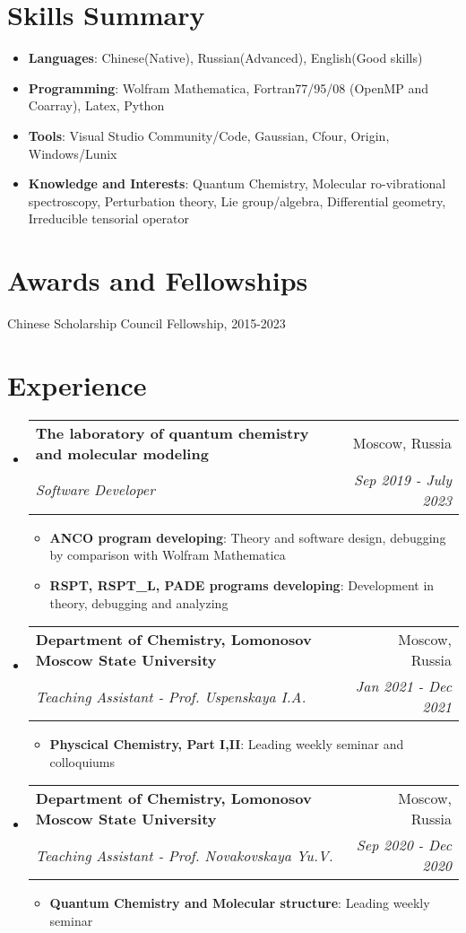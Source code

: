 \documentclass[letterpaper,10.8pt]{article}
\makeatletter
\newcommand{\resumeItem}[2]{
  \item\small{
    \textbf{#1}{: #2 \vspace{-2pt}}
  }
}
\newcommand{\resumeSubheading}[4]{
  \vspace{-1pt}\item
    \begin{tabular*}{0.97\textwidth}{l@{\extracolsep{\fill}}r}
      \textbf{#1} & #2 \\
      \textit{\small#3} & \textit{\small #4} \\
    \end{tabular*}\vspace{-5pt}
}
\newcommand{\resumeSubItem}[2]{\resumeItem{#1}{#2}\vspace{-4pt}}
\newcommand{\resumeSubHeadingListStart}{\begin{itemize}[leftmargin=*]}
\newcommand{\resumeSubHeadingListEnd}{\end{itemize}}
\newcommand{\resumeItemListStart}{\begin{itemize}}
\newcommand{\resumeItemListEnd}{\end{itemize}\vspace{-5pt}}
\makeatother
\begin{document}
\section{Skills Summary}
	\resumeSubHeadingListStart
	\resumeSubItem{Languages}{Chinese(Native), Russian(Advanced), English(Good skills)}
    \resumeSubItem{Programming}{Wolfram Mathematica, Fortran77/95/08 (OpenMP and Coarray), Latex, Python}
    \resumeSubItem{Tools}{Visual Studio Community/Code, Gaussian, Cfour, Origin, Windows/Lunix}
    \resumeSubItem{Knowledge and Interests}{Quantum Chemistry, Molecular ro-vibrational spectroscopy, Perturbation theory, Lie group/algebra, Differential geometry, Irreducible tensorial operator}    
\resumeSubHeadingListEnd

\section{Awards and Fellowships}
\begin{description}[font=$\bullet$]
\item {Chinese Scholarship Council Fellowship, 2015-2023} 
\end{description}


\section{Experience}
  \resumeSubHeadingListStart
    \resumeSubheading
        {The laboratory of quantum chemistry and molecular modeling}{Moscow, Russia}
        {Software Developer}{Sep 2019 - July 2023}
    \resumeItemListStart
    \resumeItem{ANCO program developing}{Theory and software design, debugging by comparison with Wolfram Mathematica}
    \resumeItem{RSPT, RSPT\_L, PADE programs developing}{Development in theory, debugging and analyzing}
    \resumeItemListEnd
    
    \resumeSubheading
		{Department of Chemistry, Lomonosov Moscow State University}{Moscow, Russia}
		{Teaching Assistant - Prof. Uspenskaya I.A. }{Jan 2021 - Dec 2021}
		\resumeItemListStart
        \resumeItem{Physcical Chemistry, Part I,II}{Leading weekly seminar and colloquiums}
		\resumeItemListEnd

    \resumeSubheading
		{Department of Chemistry, Lomonosov Moscow State University}{Moscow, Russia}
		{Teaching Assistant - Prof. Novakovskaya Yu.V. }{Sep 2020 - Dec 2020}
		\resumeItemListStart
        \resumeItem{Quantum Chemistry and Molecular structure}{Leading weekly seminar}
		\resumeItemListEnd
\resumeSubHeadingListEnd
\end{document}
